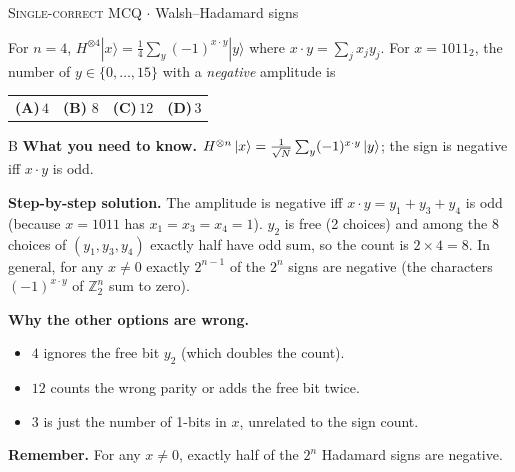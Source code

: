 \documentclass[11pt,a4paper]{article}
\newcommand{\optlabel}[1]{\textbf{(#1)}}
\newcommand{\correctlabel}[1]{\textcolor{okgreen}{\textbf{(#1)}\,\ding{51}}}
\newenvironment{qitem}[1]{\begin{list}{}{\setlength{\leftmargin}{3.3em}\setlength{\labelwidth}{3.1em}%
  \setlength{\labelsep}{0.2em}\setlength{\topsep}{3pt}\setlength{\parsep}{3pt}}\item[\textbf{Q.#1}\hfill]}{\end{list}}
\newcommand{\qsep}{\par\vspace{2pt}{\color{black!15}\hrule}\vspace{4pt}}
\newcommand{\qmeta}[2]{{\footnotesize\color{black!60}\textsc{#1} \;$\cdot$\; #2}\par}
\begin{document}
\begin{qitem}{10}
\qmeta{Single-correct MCQ}{Walsh--Hadamard signs}
For $n = 4$, $H^{\otimes 4}|x\rangle = \frac14\sum_{y}(-1)^{x\cdot y}|y\rangle$ where $x\cdot y = \sum_j x_jy_j$.
For $x = 1011_2$, the number of $y \in \{0,\dots,15\}$ with a \emph{negative} amplitude is
\par\smallskip\noindent\begin{tabularx}{\linewidth}{@{}*{4}{L}@{}}
\optlabel{A}\,$4$ & \correctlabel{B}\,$8$ & \optlabel{C}\,$12$ & \optlabel{D}\,$3$
\end{tabularx}
\end{qitem}
\begin{solbox}{B}
\textbf{\color{brand}What you need to know.} $H^{\otimes n}\ket{x} = \frac{1}{\sqrt N}\sum_y (-1)^{x\cdot y}\ket{y}$; the sign is negative iff $x\cdot y$ is odd.

\textbf{\color{brand}Step-by-step solution.} The amplitude is negative iff $x\cdot y = y_1 + y_3 + y_4$ is odd (because $x = 1011$ has $x_1 = x_3 = x_4 = 1$).
$y_2$ is free (2 choices) and among the 8 choices of $(y_1, y_3, y_4)$ exactly half have odd sum, so the count is $2 \times 4 = 8$.
In general, for any $x \neq 0$ exactly $2^{n-1}$ of the $2^n$ signs are negative (the characters $(-1)^{x\cdot y}$ of
$\mathbb{Z}_2^n$ sum to zero).

\textbf{\color{brand}Why the other options are wrong.}
\begin{itemize}[leftmargin=2.4em, itemsep=1pt, topsep=2pt]
\item[\textbf{(A)}] $4$ ignores the free bit $y_2$ (which doubles the count).
\item[\textbf{(C)}] $12$ counts the wrong parity or adds the free bit twice.
\item[\textbf{(D)}] $3$ is just the number of 1-bits in $x$, unrelated to the sign count.
\end{itemize}
\textbf{\color{brand}Remember.} For any $x \neq 0$, exactly half of the $2^n$ Hadamard signs are negative.
\end{solbox}
\qsep
\end{document}
